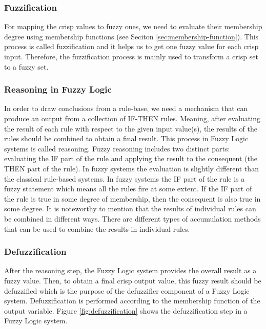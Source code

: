 \documentclass[11pt]{article}
\begin{document}
\subsubsection{Fuzzification}
\label{sec:fuzzification}

For mapping the crisp values to fuzzy ones, we need to evaluate their membership
degree using membership functions (see Seciton \ref{sec:membership-function}).
This process is called fuzzification and it helps us to get one fuzzy value for
each crisp input. Therefore, the fuzzification process is mainly used to
transform a crisp set to a fuzzy set.

\subsubsection{Reasoning in Fuzzy Logic}
\label{sec:reasoning}

In order to draw conclusions from a rule-base, we need a mechanism that can
produce an output from a collection of IF-THEN rules. Meaning, after evaluating
the result of each rule with respect to the given input value(s), the results of
the rules should be combined to obtain a final result. This process in Fuzzy
Logic systems is called reasoning. Fuzzy reasoning includes two distinct parts:
evaluating the IF part of the rule and applying the result to the consequent
(the THEN part of the rule). In fuzzy systems the evaluation is slightly
different than the classical rule-based systems. In fuzzy systems the IF part of
the rule is a fuzzy statement which means all the rules fire at some extent. If
the IF part of the rule is true in some degree of membership, then the
consequent is also true in some degree. It is noteworthy to mention that the
results of individual rules can be combined in different ways. There are
different types of accumulation methods that can be used to combine the results
in individual rules.

\subsubsection{Defuzzification}
\label{sec:defuzzification}

After the reasoning step, the Fuzzy Logic system provides the overall result as
a fuzzy value. Then, to obtain a final crisp output value, this fuzzy result
should be defuzzified which is the purpose of the defuzzifier component of a
Fuzzy Logic system. Defuzzification is performed according to the membership
function of the output variable. Figure \ref{fig:defuzzification} shows the
defuzzification step in a Fuzzy Logic system.
\end{document}
